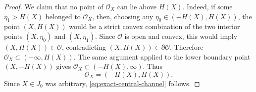 \documentclass[reqno,12pt]{amsart}
\numberwithin{equation}{section}
\newtheorem{lemma}[theorem]{Lemma}
\theoremstyle{remark}
\begin{document}
\begin{proof}
We claim that no point of $\mathcal O_X$ can lie above $H(X)$. Indeed, if some $\eta_1>H(X)$ belonged to $\mathcal O_X$, then, choosing any $\eta_0\in(-H(X),H(X))$, the point $(X,H(X))$ would be a strict convex combination of the two interior points $(X,\eta_0)$ and $(X,\eta_1)$. Since $\mathcal O$ is open and convex, this would imply $(X,H(X))\in\mathcal O$, contradicting $(X,H(X))\in\partial\mathcal O$. Therefore
$\mathcal O_X\subset (-\infty,H(X)).$
The same argument applied to the lower boundary point $(X,-H(X))$ gives $\mathcal O_X\subset (-H(X),\infty).$
Thus
$$
\mathcal O_X=(-H(X),H(X)).
$$
Since $X\in J_0$ was arbitrary, \eqref{eq:exact-central-channel} follows.
\end{proof}





\end{document}
